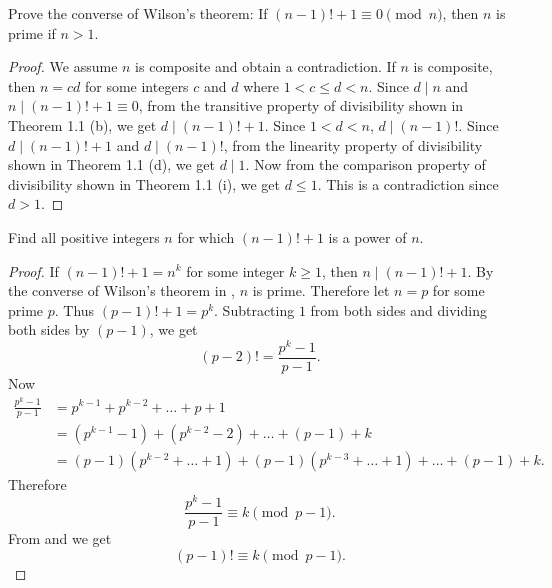 \begin{exercise}{7}{}
  Prove the converse of Wilson's theorem: If \( (n - 1)! + 1 \equiv 0
  \pmod{n} \), then \( n \) is prime if \( n > 1 \).
\end{exercise}

\begin{proof}
  We assume \( n \) is composite and obtain a contradiction. If \( n
  \) is composite, then \( n = cd \) for some integers \( c \) and \(
  d \) where \( 1 < c \le d < n \). Since \( d \mid n \) and \( n \mid
  (n - 1)! + 1 \equiv 0 \), from the transitive property of
  divisibility shown in Theorem 1.1 (b), we get \( d \mid (n - 1)! + 1
  \). Since \( 1 < d < n \), \( d \mid (n - 1)! \). Since \( d \mid (n
  - 1)! + 1 \) and \( d \mid (n - 1)! \), from the linearity property
  of divisibility shown in Theorem 1.1 (d), we get \( d \mid 1 \). Now
  from the comparison property of divisibility shown in Theorem 1.1
  (i), we get \( d \le 1 \). This is a contradiction since \( d > 1
  \).
\end{proof}


\begin{exercise}{8}{}
  Find all positive integers \( n \) for which \( (n - 1)! + 1 \) is a
  power of \( n \).
\end{exercise}

\begin{proof}
  If \( (n - 1)! + 1 = n^k \) for some integer \( k \ge 1 \), then \(
  n \mid (n - 1)! + 1 \). By the converse of Wilson's theorem in
  , \( n \) is prime. Therefore let \( n = p \) for some
  prime \( p \). Thus \( (p - 1)! + 1 = p^k \). Subtracting \( 1 \)
  from both sides and dividing both sides by \( (p - 1) \), we get
  \begin{equation}
    \label{eq:5.8:1}
    (p - 2)! = \frac{p^k - 1}{p - 1}.
  \end{equation}
  Now
  \begin{align*}
    \frac{p^k - 1}{p - 1}
    & = p^{k-1} + p^{k-2} + \dots + p + 1 \\
    & = (p^{k-1} - 1) + (p^{k-2} - 2) + \dots + (p - 1) + k \\
    & = (p - 1)(p^{k-2} + \dots + 1) +
        (p - 1)(p^{k-3} + \dots + 1) + \dots + (p - 1) + k.
  \end{align*}
  Therefore
  \begin{equation}
    \label{eq:5.8:2}
    \frac{p^k - 1}{p - 1} \equiv k \pmod{p - 1}.
  \end{equation}
  From  and  we get
  \[
    (p - 1)! \equiv k \pmod{p - 1}.
  \]
\end{proof}
